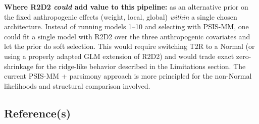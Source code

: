 \documentclass[
  letterpaper,
  DIV=11,
  numbers=noendperiod]{scrartcl}
\newlength{\cslhangindent}
\newenvironment{CSLReferences}[2] %
 {\begin{list}{}{%
  \setlength{\itemindent}{0pt}
  \setlength{\leftmargin}{0pt}
  \setlength{\parsep}{0pt}
  \ifodd #1
   \setlength{\leftmargin}{\cslhangindent}
   \setlength{\itemindent}{-1\cslhangindent}
  \fi
  \setlength{\itemsep}{#2\baselineskip}}}
 {\end{list}}
\begin{document}
\begin{tcolorbox}
\textbf{Where R2D2 \emph{could} add value to this pipeline:} as an
alternative prior on the fixed anthropogenic effects (weight, local,
global) \emph{within} a single chosen architecture. Instead of running
models 1--10 and selecting with PSIS-MM, one could fit a single model
with R2D2 over the three anthropogenic covariates and let the prior do
soft selection. This would require switching T2R to a Normal (or using a
properly adapted GLM extension of R2D2) and would trade exact
zero-shrinkage for the ridge-like behavior described in the Limitations
section. The current PSIS-MM + parsimony approach is more principled for
the non-Normal likelihoods and structural comparison involved.

\end{tcolorbox}

\subsection{Reference(s)}\label{references}

\label{refs}
\begin{CSLReferences}{0}{1}
\end{CSLReferences}
\end{document}
